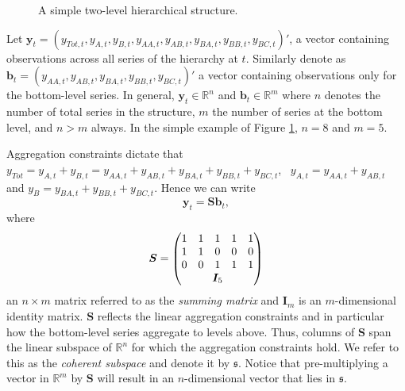 \documentclass[graybox]{svmult}
\begin{document}
\begin{figure}[!hbt]  \center
  \caption{A simple two-level hierarchical structure.}
  \label{fig:simple tree}
\end{figure}

Let $\bm{y}_t = (y_{Tot,t},y_{A,t}, y_{B,t},y_{AA,t}, y_{AB,t}, y_{BA,t}, y_{BB,t},y_{BC,t})'$, a vector containing observations across all series of the hierarchy at $t$. Similarly denote as \linebreak $\bm{b}_t = (y_{AA,t}, y_{AB,t}, y_{BA,t}, y_{BB,t}, y_{BC,t})'$ a vector containing observations only for the bottom-level series. In general, $\bm{y}_t\in \mathbb{R}^n$ and $\bm{b}_t \in \mathbb{R}^m$ where $n$ denotes the number of total series in the structure, $m$ the number of series at the bottom level, and $n>m$ always. In the simple example of Figure \ref{fig:simple tree}, $n=8$ and $m=5$.

Aggregation constraints dictate that $y_{Tot}=y_{A,t}+y_{B,t}=y_{AA,t}+y_{AB,t}+y_{BA,t}+y_{BB,t}+y_{BC,t}$,~ $y_{A,t}=y_{AA,t}+y_{AB,t}$ and $y_{B}=y_{BA,t}+y_{BB,t}+y_{BC,t}$. Hence we can write
\begin{equation}\label{eq:summing matrix}
\bm{y}_t = \bm{Sb}_t,
\end{equation}
where \begin{equation*}
\bm{S} = \begin{pmatrix}
1& 1& 1& 1 & 1 \\
1& 1& 0& 0 & 0\\
0& 0& 1& 1 & 1\\
& \multicolumn{3}{c}{\bm{I}_5} &
\end{pmatrix}
\end{equation*}
an $n\times m$ matrix referred to as the \textit{summing matrix} and $\bm{I}_m$ is an $m$-dimensional identity matrix. $\bm{S}$ reflects the linear aggregation constraints and in particular how the bottom-level series aggregate to levels above. Thus, columns of $\bm{S}$ span the linear subspace of $\mathbb{R}^n$ for which the aggregation constraints hold. We refer to this as the \textit{coherent subspace} and denote it by $\mathfrak{s}$. Notice that pre-multiplying a vector in $\mathbb{R}^m$ by $\bm{S}$ will result in an $n$-dimensional vector that lies in $\mathfrak{s}$.
\end{document}

